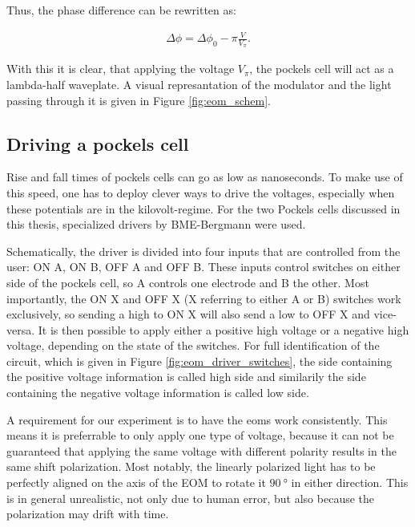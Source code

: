 Thus, the phase difference can be rewritten as:

\begin{align}
	\label{eq:eom_phase_diff}
	\Delta \phi = \Delta \phi_0 - \pi \frac{V}{V_\pi} .
\end{align}

With this it is clear, that applying the voltage $V_\pi$, the pockels cell will act as a lambda-half waveplate. A visual represantation of the modulator and the light passing through it is given in Figure \ref{fig:eom_schem}.

\subsection{Driving a pockels cell}

Rise and fall times of pockels cells can go as low as nanoseconds. To make use of this speed, one has to deploy clever ways to drive the voltages, especially when these potentials are in the kilovolt-regime. For the two Pockels cells discussed in this thesis, specialized drivers by BME-Bergmann  were used.

Schematically, the driver is divided into four inputs that are controlled from the user: ON A, ON B, OFF A and OFF B. These inputs control switches on either side of the pockels cell, so A controls one electrode and B the other. Most importantly, the ON X and OFF X (X referring to either A or B) switches work exclusively, so sending a high to ON X will also send a low to OFF X and vice-versa. It is then possible to apply either a positive high voltage or a negative high voltage, depending on the state of the switches. For full identification of the circuit, which is given in Figure \ref{fig:eom_driver_switches}, the side containing the positive voltage information is called high side and similarily the side containing the negative voltage information is called low side.

A requirement for our experiment is to have the \acp{eom} work consistently. This means it is preferrable to only apply one type of voltage, because it can not be guaranteed that applying the same voltage with different polarity results in the same shift polarization. Most notably, the linearly polarized light has to be perfectly aligned on the axis of the EOM to rotate it $\SI{90}{\degree}$ in either direction. This is in general unrealistic, not only due to human error, but also because the polarization may drift with time.


